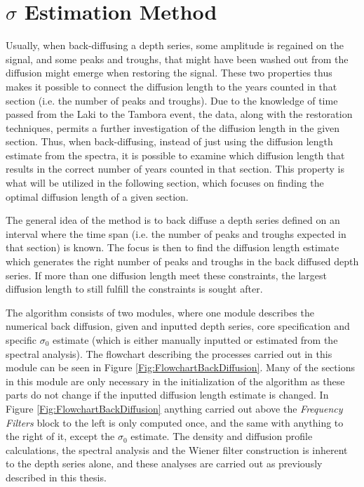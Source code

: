 \documentclass[../../CompleteThesis2/Complete_2ndDraft]{subfiles}
\begin{document}
\section[$\sigma$ Estimation Method][$\sigma$ Estimation Method]{$\sigma$ Estimation Method}
\label{Sec:Method_SigmaMethod}
Usually, when back-diffusing a depth series, some amplitude is regained on the signal, and some peaks and troughs, that might have been washed out from the diffusion might emerge when restoring the signal. These two properties thus makes it possible to connect the diffusion length to the years counted in that section (i.e. the number of peaks and troughs). Due to the knowledge of time passed from the Laki to the Tambora event, the data, along with the restoration techniques, permits a further investigation of the diffusion length in the given section. Thus, when back-diffusing, instead of just using the diffusion length estimate from the spectra, it is possible to examine which diffusion length that results in the correct number of years counted in that section. This property is what will be utilized in the following section, which focuses on finding the optimal diffusion length of a given section.

The general idea of the method is to back diffuse a depth series defined on an interval where the time span (i.e. the number of peaks and troughs expected in that section) is known. The focus is then to find the diffusion length estimate which generates the right number of peaks and troughs in the back diffused depth series. If more than one diffusion length meet these constraints, the largest diffusion length to still fulfill the constraints is sought after. 

The algorithm consists of two modules, where one module describes the numerical back diffusion, given and inputted depth series, core specification and specific $\sigma_0$ estimate (which is either manually inputted or estimated from the spectral analysis). The flowchart describing the processes carried out in this module can be seen in Figure \ref{Fig:FlowchartBackDiffusion}. Many of the sections in this module are only necessary in the initialization of the algorithm as these parts do not change if the inputted diffusion length estimate is changed. In Figure \ref{Fig:FlowchartBackDiffusion} anything carried out above the \textit{Frequency Filters} block to the left is only computed once, and the same with anything to the right of it, except the $\sigma_0$ estimate. The density and diffusion profile calculations, the spectral analysis and the Wiener filter construction is inherent to the depth series alone, and these analyses are carried out as previously described in this thesis.
\end{document}
